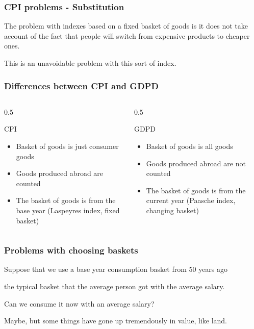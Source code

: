\documentclass[aspectratio=169]{beamer}
\newenvironment{wideitemize}{\itemize\addtolength{\itemsep}{10pt}}{\enditemize}
\begin{document}
\begin{frame}
\frametitle{CPI problems - Substitution}
\begin{wideitemize}
\item The problem with indexes based on a fixed basket of goods is it does not take account of the fact that people will switch from expensive products to cheaper ones.
\item This is an unavoidable problem with this sort of index.
\end{wideitemize}
\end{frame}



\begin{frame}
\frametitle{Differences between CPI and GDPD}
\begin{columns}[T]
\begin{column}{0.5\textwidth}
\begin{wideitemize}
\item CPI
\begin{itemize}
\item Basket of goods is just consumer goods
\item Goods produced abroad are counted
\item The basket of goods is from the base year (Laspeyres index, fixed basket)
\end{itemize}
\end{wideitemize}
\end{column}

\begin{column}{0.5\textwidth}
\begin{wideitemize}
\item GDPD
\begin{itemize}
\item Basket of goods is all goods
\item Goods produced abroad are not counted
\item The basket of goods is from the current year (Paasche index, changing basket)
\end{itemize}
\end{wideitemize}
\end{column}
\end{columns}
\end{frame}


\begin{frame}
\frametitle{Problems with choosing baskets}
\begin{wideitemize}
\item Suppose that we use a base year consumption basket from 50 years ago
\begin{wideitemize}
\item the typical basket that the average person got with the average salary.
\end{wideitemize}
\item Can we consume it now with an average salary?
\item Maybe, but some things have gone up tremendously in value, like land.
\end{wideitemize}
\end{frame}
\end{document}
